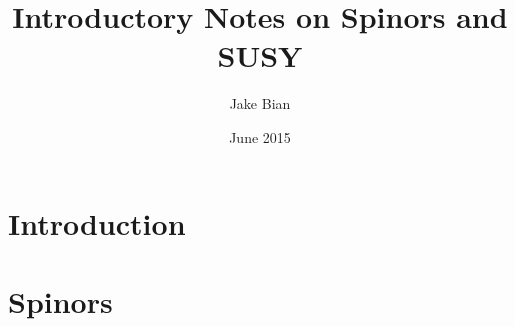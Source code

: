 \documentclass{article}
\title{ Introductory Notes on Spinors and SUSY  }
\author{Jake Bian}
\date{June 2015}
\begin{document}
    \maketitle

    \newtheorem{defn}{Definition}[subsection]
    \newtheorem{thm}{Theorem}[subsection]

    \section{Introduction}
        

    \section{Spinors}
        
\end{document}
